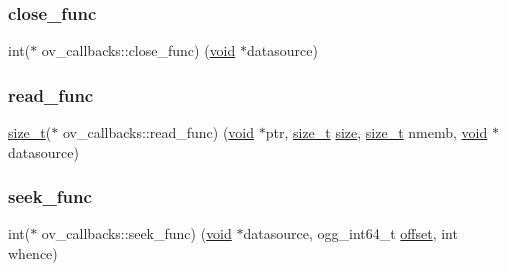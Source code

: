 \subsubsection{\texorpdfstring{close\+\_\+func}{close\_func}}
{\footnotesize\ttfamily int($\ast$ ov\+\_\+callbacks\+::close\+\_\+func) (\mbox{\hyperlink{_s_d_l__opengles2__gl2ext_8h_ae5d8fa23ad07c48bb609509eae494c95}{void}} $\ast$datasource)}

\mbox{\label{structov__callbacks_a301b93b9f0436e5bde6dbdeb0edeae77}} 
\subsubsection{\texorpdfstring{read\+\_\+func}{read\_func}}
{\footnotesize\ttfamily \mbox{\hyperlink{_s_d_l__config_8h_a7c94ea6f8948649f8d181ae55911eeaf}{size\+\_\+t}}($\ast$ ov\+\_\+callbacks\+::read\+\_\+func) (\mbox{\hyperlink{_s_d_l__opengles2__gl2ext_8h_ae5d8fa23ad07c48bb609509eae494c95}{void}} $\ast$ptr, \mbox{\hyperlink{_s_d_l__config_8h_a7c94ea6f8948649f8d181ae55911eeaf}{size\+\_\+t}} \mbox{\hyperlink{_s_d_l__opengl__glext_8h_a3d1e3edfcf61ca2d831883e1afbad89e}{size}}, \mbox{\hyperlink{_s_d_l__config_8h_a7c94ea6f8948649f8d181ae55911eeaf}{size\+\_\+t}} nmemb, \mbox{\hyperlink{_s_d_l__opengles2__gl2ext_8h_ae5d8fa23ad07c48bb609509eae494c95}{void}} $\ast$datasource)}

\mbox{\label{structov__callbacks_aa49d8079756c1c26e2ba9b974e463dfa}} 
\subsubsection{\texorpdfstring{seek\+\_\+func}{seek\_func}}
{\footnotesize\ttfamily int($\ast$ ov\+\_\+callbacks\+::seek\+\_\+func) (\mbox{\hyperlink{_s_d_l__opengles2__gl2ext_8h_ae5d8fa23ad07c48bb609509eae494c95}{void}} $\ast$datasource, ogg\+\_\+int64\+\_\+t \mbox{\hyperlink{_s_d_l__opengl__glext_8h_ac915cd848f42b26af51745f204a3b9af}{offset}}, int whence)}

\mbox{\label{structov__callbacks_ab078f3f386b7c58e9fab2ede904e0e36}} 
